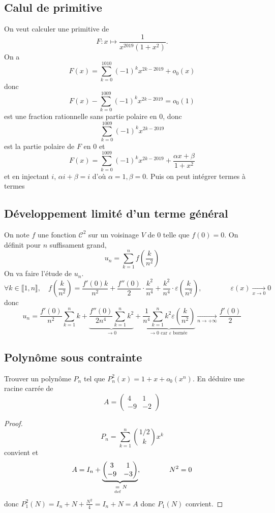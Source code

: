 \subsection{Calul de primitive}

On veut calculer une primitive de \[
    F:x\longmapsto \frac1{x^{2019}(1+x^2)}.
\]
On a \[
    F(x)=\sum_{k=0}^{1010}(-1)^kx^{2k-2019}+o_0(x)
\]
donc \[
    F(x)-\sum_{k=0}^{1009}(-1)^kx^{2k-2019}=o_0(1)
\]
est une fraction rationnelle sans partie polaire en $0$, donc \[
    \sum_{k=0}^{1009}(-1)^kx^{2k-2019}
\]
est la partie polaire de $F$ en $0$ et \[
    F(x)=\sum_{k=0}^{1009}(-1)^kx^{2k-2019}+\frac{\alpha x+\beta}{1+x^2}
\]
et en injectant $i$, $\alpha i+\beta=i$ d'où $\alpha=1, \beta=0$. Puis on peut intégrer termes à termes

\subsection{Développement limité d'un terme général}

On note $f$ une fonction $\mathcal C^2$ sur un voisinage $V$ de $0$ telle que $f(0)=0$. On définit pour $n$ suffisament grand, \[
    u_n=\sum_{k=1}^nf\left(\frac{k}{n^2}\right)
\]
On va faire l'étude de $u_n$. \[
    \forall k\in\llbracket 1, n\rrbracket, \quad f \left( \frac{k}{n^2} \right)=\frac{f'(0)k}{n^2}+\frac{f''(0)}{2}\cdot \frac {k^2}{n^4}+\frac {k^2}{n^4}\cdot \varepsilon \left( \frac{k}{n^2} \right), \qquad \qquad \varepsilon (x)\xrightarrow[x\to0]{}0
\]
donc \[
    u_n=\frac{f'(0)}{n^2}\sum_{k=1}^nk+\underbrace{\frac{f''(0)}{2n^4}\sum_{k=1}^nk^2}_{\longrightarrow 0}+\underbrace{\frac1{n^4}\sum_{k=1}^nk^2\varepsilon \left( \frac k{n^2} \right)}_{\longrightarrow 0\text{ car }\varepsilon\text{ bornée }}\xrightarrow[n\to+\infty]{}\frac{f'(0)}2
\]

\subsection{Polynôme sous contrainte}

\begin{exo}
Trouver un polynôme $P_n$ tel que $P_n^2(x)=1+x+o_0(x^n)$. En déduire une racine carrée de \[
    A= \begin{pmatrix}
        4&1\\-9&-2
    \end{pmatrix}
\]
\end{exo}
\begin{proof}
    \[
        P_n=\sum_{k=1}^n\binom{1/2}{k}x^k
    \]
    convient et \[
        A=I_n+ \underbrace{\begin{pmatrix}
            3&1\\-9&-3
    \end{pmatrix}}_{\;\underset{\text{def}}=\; N},\qquad \qquad N^2=0
    \]
    donc $P_1^2(N)=I_n+N+\frac{N^2}4=I_n+N=A$ donc $P_1(N)$ convient.
\end{proof}

